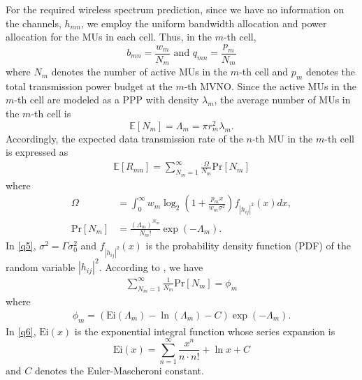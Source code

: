 \documentclass[journal]{IEEEtran}
\begin{document}
For the required wireless spectrum prediction, since we have no information on the channels, $h_{mn}$, we employ the uniform bandwidth allocation and power allocation for the MUs in each cell. Thus, in the $m$-th cell,
\begin{equation}
b_{mn} = \frac{w_m}{N_m} \mbox{ and }q_{mn}=\frac{p_m}{N_m}
\end{equation}
where $N_m$ denotes the number of active MUs in the $m$-th cell and $p_m$ denotes the total transmission power budget at the $m$-th MVNO. Since the active MUs in the $m$-th cell are modeled as a PPP with density $\lambda_m$, the average number of MUs in the $m$-th cell is
\begin{equation}
\mathbb{E}[N_m]=\Lambda_m=\pi r_m^2 \lambda_m.
\end{equation}
Accordingly, the expected data transmission rate of {\color{red}the $n$-th MU in the $m$-th cell }is expressed as
\begin{align}
\mathbb{E}\left[{R}_{mn}\right] = \sum_{N_m=1}^{\infty}\frac{\Omega}{N_m}\mbox{Pr}[N_m]
\end{align}
where
\begin{align}
\label{q5}\Omega&=\int_{0}^{\infty} w_m\log_2\left(1 + \frac{p_m x}{w_m \sigma^2}\right) f_{\left|h_{ij} \right|^2} \left(x\right)dx,\\
\mbox{Pr}[N_m]&=\frac{(\Lambda_m)^{N_m}}{N_m!}\exp\left(-\Lambda_m\right).
\end{align}
In \eqref{q5}, $\sigma^2=\Gamma \sigma_0^2$ and $f_{\left|h_{ij} \right|^2} \left(x\right)$ is the probability density function (PDF) of the random variable $\left|h_{ij} \right|^2$. According to \cite{MAbramowitz}, we have
\begin{align}
\sum_{N_m=1}^{\infty}\frac{1}{N_m}\mbox{Pr}[N_m]=\phi_m
\end{align}
where
\begin{align}\label{q6}
\phi_m= \left(\mbox{Ei}\left(\Lambda_m\right) - \ln\left(\Lambda_m\right)- C\right)\exp\left(-\Lambda_m\right).
\end{align}
In \eqref{q6}, $\mbox{Ei}\left(x\right)$ is the exponential integral function whose series expansion is \cite[5.1.10]{MAbramowitz}
\begin{equation}
\mbox{Ei}\left(x\right) =\sum\limits_{n = 1}^{\infty}\frac{x^n}{n\cdot n!}+\ln x+C
\end{equation}
and $C$ denotes the Euler-Mascheroni constant.
\end{document}
